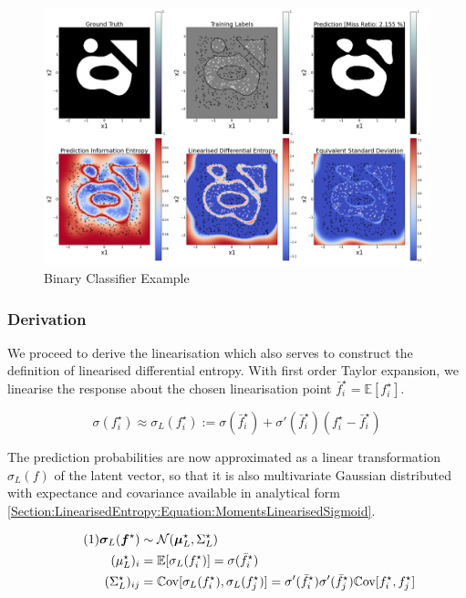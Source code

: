 \documentclass{article}
\renewcommand{\vec}[1]{\boldsymbol{#1}}
\newcommand\numberthis{\addtocounter{equation}{1}\tag{\theequation}}
\begin{document}
		\begin{figure}[!htbp]
		\centering
			\includegraphics[width = \linewidth]{Figures/binary_linearised_entropy_horizontal/Figure1.png}
		\caption{Binary Classifier Example}
		\label{Figure:Results:BinaryLinearisedEntropy}
		\end{figure}
		
		\subsubsection{Derivation}
		
			We proceed to derive the linearisation which also serves to construct the definition of linearised differential entropy. With first order Taylor expansion, we linearise the response about the chosen linearisation point $\bar{f}^{\star}_{i} = \mathbb{E}[f^{\star}_{i}]$.
			
			\begin{equation}
				\sigma(f^{\star}_{i}) \approx \sigma_{L}(f^{\star}_{i}) := \sigma(\bar{f}^{\star}_{i}) + \sigma'(\bar{f}^{\star}_{i}) (f^{\star}_{i} - \bar{f}^{\star}_{i})
			\label{Section:LinearisedEntropy:Equation:LinearisingSigmoid}
			\end{equation}
			
			The prediction probabilities are now approximated as a linear transformation $\sigma_{L}(f)$ of the latent vector, so that it is also multivariate Gaussian distributed with expectance and covariance available in analytical form \eqref{Section:LinearisedEntropy:Equation:MomentsLinearisedSigmoid}.
			
			\begin{align*}
			\numberthis \label{Section:LinearisedEntropy:Equation:MomentsLinearisedSigmoid}
					\vec{\sigma}_{L}(\vec{f}^{\star}) & \sim \mathcal{N}(\vec{\mu}^{\star}_{L}, \Sigma^{\star}_{L}) \\
					({\mu^{\star}_{L}})_{i} & = \mathbb{E}[\sigma_{L}(f^{\star}_{i})] = \sigma(\bar{f}^{\star}_{i}) \\
					({\Sigma^{\star}_{L}})_{ij} & = \mathbb{C}\mathrm{ov}[\sigma_{L}(f^{\star}_{i}), \sigma_{L}(f^{\star}_{j})] = \sigma'(\bar{f}^{\star}_{i}) \sigma'(\bar{f}^{\star}_{j}) \mathbb{C}\mathrm{ov}[f^{\star}_{i}, f^{\star}_{j}]
			\end{align*}
			
\end{document}
